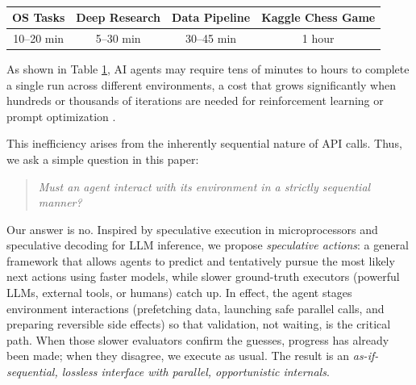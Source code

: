 \documentclass{article} %
\theoremstyle{plain} %
\theoremstyle{definition} %
\theoremstyle{remark} %
\begin{document}
\begin{table}[h]
\centering
\setlength{\tabcolsep}{8pt}
\renewcommand{\arraystretch}{1.3}
\begin{tabular}{*{4}{c}} %
\toprule
\makecell{\textbf{OS Tasks}\\ \citep{abhyankar2025osworld}} &
\makecell{\textbf{Deep Research}\\ \citep{openai2025deepresearch}} &
\makecell{\textbf{Data Pipeline}\\ \citep{jin2025elt}} &
\makecell{\textbf{Kaggle Chess Game}\\ \citep{KaggleGameArena}} \\
\midrule
10–20 min & 5–30 min & 30–45 min & 1 hour \\
\bottomrule
\end{tabular}
\caption{}
\label{tab:Agent-Wall-Time}
\end{table}
As shown in Table \ref{tab:Agent-Wall-Time}, AI agents may require tens of minutes to hours to complete a single run across different environments, a cost that grows significantly when hundreds or thousands of iterations are needed for reinforcement learning or prompt optimization \citep{agrawal2025gepa}.

This inefficiency arises from the inherently sequential nature of API calls.
Thus, we ask a simple question in this paper:
\begin{quote}
\vspace{-5pt}
\emph{Must an agent interact with its environment in a strictly sequential manner?}
\end{quote}
Our answer is no.
Inspired by speculative execution in microprocessors and speculative decoding for LLM inference, we propose \emph{speculative actions}: a general framework that allows agents to predict and tentatively pursue the most likely next actions using faster models, while slower ground-truth executors (powerful LLMs, external tools, or humans) catch up.
In effect, the agent stages environment interactions (prefetching data, launching safe parallel calls, and preparing reversible side effects) so that validation, not waiting, is the critical path.
When those slower evaluators confirm the guesses, progress has already been made; when they disagree, we execute as usual.
The result is an \emph{as-if-sequential, lossless interface with parallel, opportunistic internals}.
\end{document}
